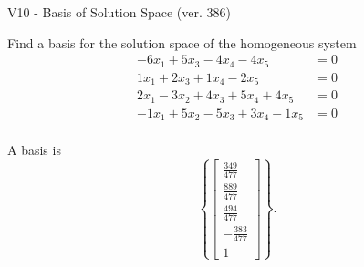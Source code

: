 \begin{exercise}
  \begin{exerciseTitle}V10 - Basis of Solution Space (ver. 386)\end{exerciseTitle}
  \begin{exerciseStatement}
    Find a basis for the solution space of the homogeneous system 
\begin{align*}
 -6 x_ 1 + 5 x_ 3 -4 x_ 4 -4 x_ 5 &= 0  \\ 
  1 x_ 1 + 2 x_ 3 + 1 x_ 4 -2 x_ 5 &= 0  \\ 
  2 x_ 1 -3 x_ 2 + 4 x_ 3 + 5 x_ 4 + 4 x_ 5 &= 0  \\ 
  -1 x_ 1 + 5 x_ 2 -5 x_ 3 + 3 x_ 4 -1 x_ 5 &= 0  \\ 
 \end{align*}


 
  \end{exerciseStatement}

  \begin{exerciseAnswer}
   A basis is   
\[\left\{\left[\begin{array}{c}
\frac{349}{477} \\
\frac{889}{477} \\
\frac{494}{477} \\
-\frac{383}{477} \\
1
\end{array}\right]\right\}.\]

  


  \end{exerciseAnswer}
\end{exercise}